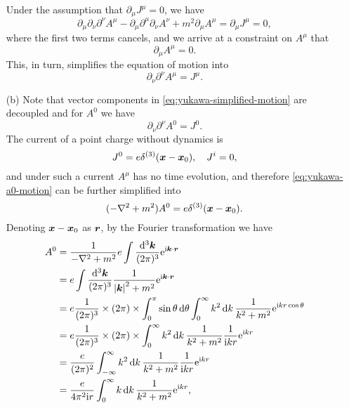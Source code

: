 \documentclass[hyperref, a4paper]{article}
\newcommand*{\ii}{\mathrm{i}}
\newcommand*{\ee}{\mathrm{e}}
\begin{document}
\begin{itemize}
    Under the assumption that $\partial_\mu J^\mu = 0$, we have
    \[
        \partial_\mu \partial_\nu \partial^\nu A^\mu - \partial_\mu \partial^\mu \partial_\nu A^\nu + m^2 \partial_\mu A^\mu = \partial_\mu J^\mu = 0,
    \]
    where the first two terms cancels, and we arrive at a constraint on $A^\mu$ that
    \begin{equation}
        \partial_\mu A^\mu = 0.
    \end{equation}
    This, in turn, simplifies the equation of motion into 
    \begin{equation}
        \partial_\nu \partial^\nu A^\mu = J^\mu.
        \label{eq:yukawa-simplified-motion}
    \end{equation}
    \item[(b)] Note that vector components in \eqref{eq:yukawa-simplified-motion} are decoupled and for $A^0$ we have
    \begin{equation}
        \partial_\nu \partial^\nu A^0 = J^0.
        \label{eq:yukawa-a0-motion}
    \end{equation}
    The current of a point charge without dynamics is 
    \[
        J^0 = e \delta^{(3)}(\vb*{x} - \vb*{x}_0), \quad J^i = 0, 
    \]
    and under such a current $A^\mu$ has no time evolution, and therefore \eqref{eq:yukawa-a0-motion} can be further simplified into 
    \begin{equation}
        (- \laplacian + m^2) A^0 = e \delta^{(3)}(\vb*{x} - \vb*{x}_0).
    \end{equation}
    Denoting $\vb*{x} - \vb*{x}_0$ as $\vb*{r}$, by the Fourier transformation we have
    \[
        \begin{aligned}
            A^0 &= \frac{1}{- \laplacian + m^2} e \int \frac{\dd[3]{\vb*{k}}}{(2\pi)^3} \ee^{\ii \vb*{k} \cdot \vb*{r}} \\
            &= e \int \frac{\dd[3]{\vb*{k}}}{(2\pi)^3} \frac{1}{\abs{\vb*{k}}^2 + m^2} \ee^{\ii \vb*{k} \cdot \vb*{r}} \\
            &= e \frac{1}{(2\pi)^3} \times (2\pi) \times \int_{0}^\pi \sin \theta \dd{\theta} \int_0^\infty k^2 \dd{k} \frac{1}{k^2 + m^2} \ee^{\ii k r \cos \theta} \\
            &= e \frac{1}{(2\pi)^3} \times (2\pi) \times \int_0^\infty k^2 \dd{k} \frac{1}{k^2 + m^2} \frac{1}{\ii k r} \ee^{\ii k r} \\
            &= \frac{e}{(2\pi)^2} \int_{-\infty}^\infty k^2 \dd{k} \frac{1}{k^2 + m^2} \frac{1}{\ii k r} \ee^{\ii k r} \\
            &= \frac{e}{4\pi^2 \ii r} \int_0^\infty k \dd{k} \frac{1}{k^2 + m^2} \ee^{\ii k r} ,

\end{aligned}\]
\end{itemize}
\end{document}
